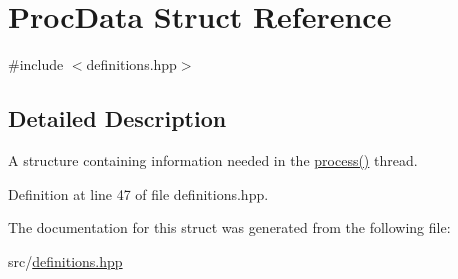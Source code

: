 \hypertarget{structProcData}{\section{Proc\+Data Struct Reference}
\label{structProcData}
}


{\ttfamily \#include $<$definitions.\+hpp$>$}



\subsection{Detailed Description}
A structure containing information needed in the \hyperlink{namespacevaso_acd767ffd09e8d7323a0275e8f88a6de2}{process()} thread. 

Definition at line 47 of file definitions.\+hpp.



The documentation for this struct was generated from the following file\+:\begin{DoxyCompactItemize}
\item 
src/\hyperlink{definitions_8hpp}{definitions.\+hpp}\end{DoxyCompactItemize}
